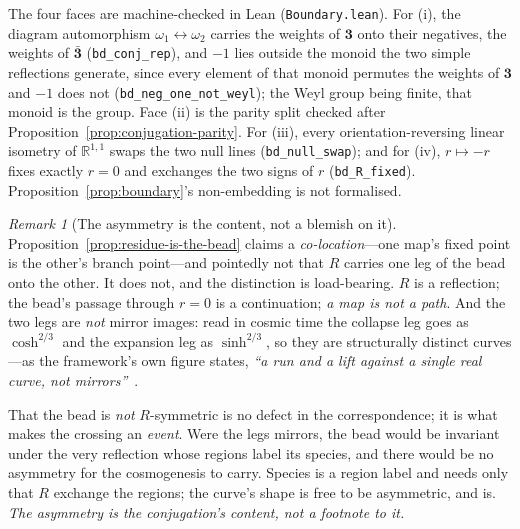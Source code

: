 \documentclass[11pt]{article}
\theoremstyle{plain}
\theoremstyle{remark}
\newtheorem{remark}{Remark}
\begin{document}
\noindent The four faces are machine-checked in Lean (\texttt{Boundary.lean}). For \textup{(i)}, the diagram automorphism $\omega_1\leftrightarrow\omega_2$ carries the weights of $\mathbf 3$ onto their negatives, the weights of $\bar{\mathbf 3}$ (\texttt{bd\_conj\_rep}), and $-1$ lies outside the monoid the two simple reflections generate, since every element of that monoid permutes the weights of $\mathbf 3$ and $-1$ does not (\texttt{bd\_neg\_one\_not\_weyl}); the Weyl group being finite, that monoid is the group. Face \textup{(ii)} is the parity split checked after Proposition~\ref{prop:conjugation-parity}. For \textup{(iii)}, every orientation-reversing linear isometry of $\mathbb{R}^{1,1}$ swaps the two null lines (\texttt{bd\_null\_swap}); and for \textup{(iv)}, $r\mapsto-r$ fixes exactly $r=0$ and exchanges the two signs of $r$ (\texttt{bd\_R\_fixed}). Proposition~\ref{prop:boundary}'s non-embedding is not formalised.

\begin{remark}[The asymmetry is the content, not a blemish on it]\label{rem:closure-asym}
Proposition~\ref{prop:residue-is-the-bead} claims a \emph{co-location}---one map's fixed point is the other's branch point---and pointedly not that $R$ carries one leg of the bead onto the other. It does not, and the distinction is load-bearing. $R$ is a reflection; the bead's passage through $r=0$ is a continuation; \emph{a map is not a path}. And the two legs are \emph{not} mirror images: read in cosmic time the collapse leg goes as $\cosh^{2/3}$ and the expansion leg as $\sinh^{2/3}$, so they are structurally distinct curves---as the framework's own figure states, \emph{``a run and a lift against a single real curve, not mirrors''}~\cite{JanzenCRframework}.

That the bead is \emph{not} $R$-symmetric is no defect in the correspondence; it is what makes the crossing an \emph{event}. Were the legs mirrors, the bead would be invariant under the very reflection whose regions label its species, and there would be no asymmetry for the cosmogenesis to carry. Species is a region label and needs only that $R$ exchange the regions; the curve's shape is free to be asymmetric, and is. \emph{The asymmetry is the conjugation's content, not a footnote to it.}
\end{remark}
\end{document}
